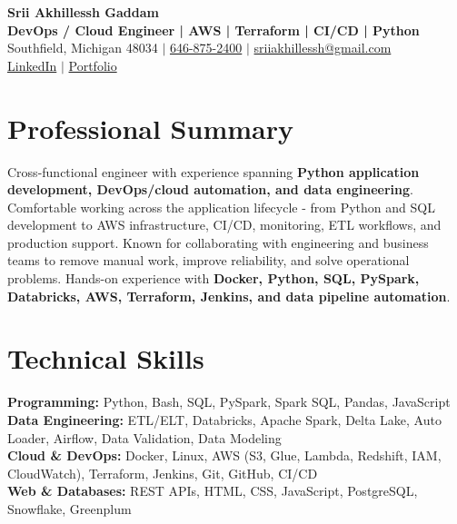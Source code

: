 \documentclass[letterpaper,10pt]{article}
\begin{document}
\fontsize{9.35pt}{10.45pt}\selectfont

\begin{center}
    {\LARGE \textbf{Srii Akhillessh Gaddam}} \\[-1pt]
    \textbf{DevOps / Cloud Engineer | AWS | Terraform | CI/CD | Python} \\[2pt]
    Southfield, Michigan 48034 $|$
    \href{tel:6468752400}{646-875-2400} $|$
    \href{mailto:sriiakhillessh@gmail.com}{sriiakhillessh@gmail.com} \\[1pt]
    \href{https://www.linkedin.com/in/srii-akhiilessh-gaddam-b48668191/}{LinkedIn} $|$
    \href{https://sriiakhillesshg.github.io/portfolio/}{Portfolio}
\end{center}
\vspace{-8pt}

\section{Professional Summary}
\small{Cross-functional engineer with experience spanning \textbf{Python application development, DevOps/cloud automation, and data engineering}. Comfortable working across the application lifecycle - from Python and SQL development to AWS infrastructure, CI/CD, monitoring, ETL workflows, and production support. Known for collaborating with engineering and business teams to remove manual work, improve reliability, and solve operational problems. Hands-on experience with \textbf{Docker, Python, SQL, PySpark, Databricks, AWS, Terraform, Jenkins, and data pipeline automation}.}

\section{Technical Skills}
\small{
\textbf{Programming:} Python, Bash, SQL, PySpark, Spark SQL, Pandas, JavaScript \\
\textbf{Data Engineering:} ETL/ELT, Databricks, Apache Spark, Delta Lake, Auto Loader, Airflow, Data Validation, Data Modeling \\
\textbf{Cloud \& DevOps:} Docker, Linux, AWS (S3, Glue, Lambda, Redshift, IAM, CloudWatch), Terraform, Jenkins, Git, GitHub, CI/CD \\
\textbf{Web \& Databases:} REST APIs, HTML, CSS, JavaScript, PostgreSQL, Snowflake, Greenplum
}
\end{document}
